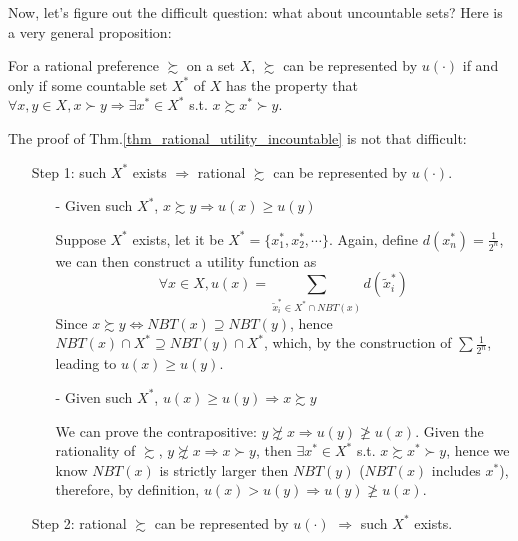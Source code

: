 Now, let's figure out the difficult question: what about uncountable sets? Here is a very general proposition:
\begin{theorem}\label{thm_rational_utility_incountable}
    For a rational preference $\succsim$ on a set $X$, $\succsim$ can be represented by $u(\cdot)$ if and only if some countable set $X^*$ of $X$ has the property that $\forall x,y\in X, x\succ y\Rightarrow \exists x^*\in X^*$ s.t. $x\succsim x^*\succ y$.
\end{theorem}
The proof of Thm.\ref{thm_rational_utility_incountable} is not that difficult:
\begin{enumerate}
    \item[Step 1:] such $X^*$ exists $\Rightarrow$ rational $\succsim$ can be represented by $u(\cdot)$.
    \begin{enumerate}
        \item[-]Given such $X^*$, $x\succsim y\Rightarrow u(x)\geq u(y)$
        
        Suppose $X^*$ exists, let it be $X^*=\{x_1^*,x_2^*,\cdots\}$. Again, define $d(x_n^*)=\frac{1}{2^n}$, we can then construct a utility function as 
        $$\forall x\in X, u(x)=\sum_{\tilde{x}_i^*\in X^*\cap NBT(x)}d(\tilde{x}^*_i)$$
        Since $x\succsim y\Leftrightarrow NBT(x)\supseteq NBT(y)$, hence $NBT(x)\cap X^*\supseteq NBT(y)\cap X^*$, which, by the construction of $\sum\frac{1}{2^n}$, leading to $u(x)\geq u(y)$.

        \item[-] Given such $X^*$, $u(x)\geq u(y)\Rightarrow x\succsim y$
        
        We can prove the contrapositive: $ y\not\succsim x\Rightarrow u(y)\not\geq u(x)$. Given the rationality of $\succsim$, $y\not\succsim x \Rightarrow x\succ y$, then $\exists x^*\in X^*$ s.t. $x\succsim x^* \succ y$, hence we know $NBT(x)$ is strictly larger then $NBT(y)$ ($NBT(x)$ includes $x^*$), therefore, by definition, $u(x)>u(y)\Rightarrow u(y)\not\geq u(x)$.
    \end{enumerate}
    
    \item[Step 2:] rational $\succsim$ can be represented by $u(\cdot)$ $\Rightarrow$ such $X^*$ exists.
    

\end{enumerate}
